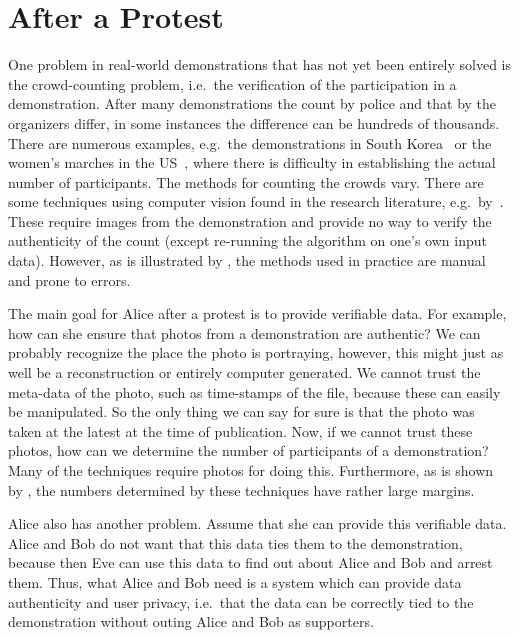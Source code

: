 \section{After a Protest}
\label{AfterProtest}

One problem in real-world demonstrations that has not yet been entirely solved 
is the crowd-counting problem, i.e.\ the verification of the participation in 
a demonstration.
After many demonstrations the count by police and that by the organizers 
differ, in some instances the difference can be hundreds of thousands.
There are numerous examples, e.g.\ the demonstrations in South 
Korea~\cite{2016DemonstrationsInSeoul} or the women's marches in the 
US~\cite{2017WomensMarchesInUS}, where there is difficulty in establishing the 
actual number of participants.
The methods for counting the crowds vary.
There are some techniques using computer vision found in the research 
literature, e.g.\ by~\textcite{CVCrowdCounting}.
These require images from the demonstration and provide no way to verify the 
authenticity of the count (except re-running the algorithm on one's own input 
data).
However, as is illustrated by 
\textcite{2016DemonstrationsInSeoul,2017WomensMarchesInUS}, the methods used in 
practice are manual and prone to errors.

The main goal for Alice after a protest is to provide verifiable data.
For example, how can she ensure that photos from a demonstration are authentic?
We can probably recognize the place the photo is portraying, however, this 
might just as well be a reconstruction or entirely computer generated.
We cannot trust the meta-data of the photo, such as time-stamps of the file, 
because these can easily be manipulated.
So the only thing we can say for sure is that the photo was taken at the latest 
at the time of publication.
Now, if we cannot trust these photos, how can we determine the number of 
participants of a demonstration?
Many of the techniques require photos for doing this.
Furthermore, as is shown by 
\textcite{2016DemonstrationsInSeoul,2017WomensMarchesInUS}, the numbers 
determined by these techniques have rather large margins.

Alice also has another problem.
Assume that she can provide this verifiable data.
Alice and Bob do not want that this data ties them to the demonstration, 
because then Eve can use this data to find out about Alice and Bob and arrest 
them.
Thus, what Alice and Bob need is a system which can provide data authenticity 
and user privacy, i.e.\ that the data can be correctly tied to the 
demonstration without outing Alice and Bob as supporters.


